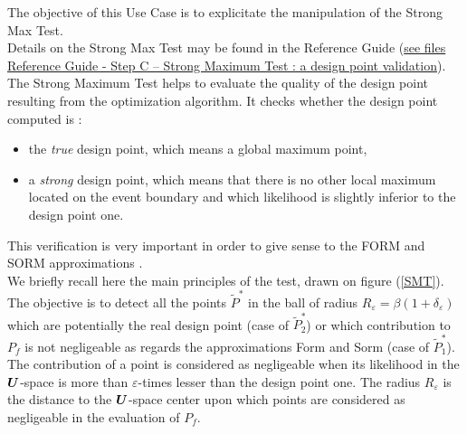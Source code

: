 \renewcommand{\filename}{docUC_ThresholdExceedance_StrongMaxTest.tex}
\renewcommand{\filetitle}{UC : Validate the design point with the Strong Maximum Test}

\HeaderIIILevel





The objective of this Use Case is to explicitate the manipulation of the Strong Max Test. \\

Details on the Strong Max Test  may be found in the Reference Guide (\href{OpenTURNS_ReferenceGuide.pdf}{see files Reference Guide - Step C -- Strong Maximum Test : a design point validation}).\\

The Strong Maximum Test helps to evaluate the quality of the design point resulting from the optimization algorithm. It checks whether the design point computed is :
\begin{itemize}
\item the {\em true} design point, which means a global maximum point,
\item a {\em strong} design point, which means that there is no other local maximum located on the event boundary and which likelihood is slightly inferior to the design point one.
\end{itemize}
This verification is very important in order to give sense to the FORM and SORM approximations .\\


We briefly recall here the main principles of the test, drawn on figure (\ref{SMT}).\\
The objective is to detect all the points $\tilde{P}^*$ in the ball of radius $R_{\varepsilon} = \beta(1+\delta_{\varepsilon})$ which are potentially the real design point (case of $\tilde{P}_2^*$) or which contribution to $P_f$ is not negligeable as regards the approximations Form and Sorm (case of $\tilde{P}_1^*$). The contribution of a point is considered as negligeable when its likelihood in the ${\boldsymbol{U}}$-space is more than $\varepsilon$-times lesser than the design point one. The radius $R_{\varepsilon}$ is the distance to the ${\boldsymbol{U}}$-space center upon which points are considered as negligeable in the evaluation of $P_f$.\\


